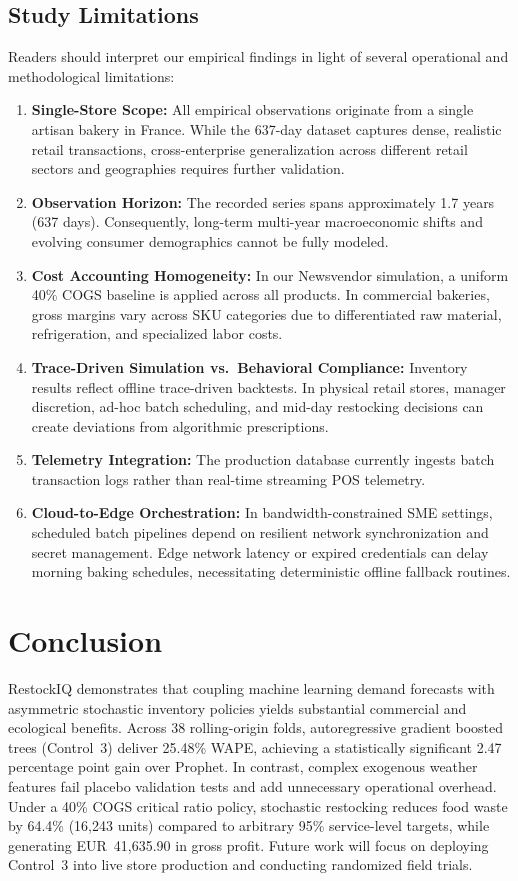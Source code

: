 \documentclass[conference]{IEEEtran}
\begin{document}
\subsection{Study Limitations}
Readers should interpret our empirical findings in light of several operational and methodological limitations:
\begin{enumerate}
    \item \textbf{Single-Store Scope:} All empirical observations originate from a single artisan bakery in France. While the 637-day dataset captures dense, realistic retail transactions, cross-enterprise generalization across different retail sectors and geographies requires further validation.
    \item \textbf{Observation Horizon:} The recorded series spans approximately 1.7 years (637 days). Consequently, long-term multi-year macroeconomic shifts and evolving consumer demographics cannot be fully modeled.
    \item \textbf{Cost Accounting Homogeneity:} In our Newsvendor simulation, a uniform 40\% COGS baseline is applied across all products. In commercial bakeries, gross margins vary across SKU categories due to differentiated raw material, refrigeration, and specialized labor costs.
    \item \textbf{Trace-Driven Simulation vs.\ Behavioral Compliance:} Inventory results reflect offline trace-driven backtests. In physical retail stores, manager discretion, ad-hoc batch scheduling, and mid-day restocking decisions can create deviations from algorithmic prescriptions.
    \item \textbf{Telemetry Integration:} The production database currently ingests batch transaction logs rather than real-time streaming POS telemetry.
    \item \textbf{Cloud-to-Edge Orchestration:} In bandwidth-constrained SME settings, scheduled batch pipelines depend on resilient network synchronization and secret management. Edge network latency or expired credentials can delay morning baking schedules, necessitating deterministic offline fallback routines.
\end{enumerate}

\section{Conclusion}
RestockIQ demonstrates that coupling machine learning demand forecasts with asymmetric stochastic inventory policies yields substantial commercial and ecological benefits. Across 38 rolling-origin folds, autoregressive gradient boosted trees (Control~3) deliver 25.48\% WAPE, achieving a statistically significant 2.47 percentage point gain over Prophet. In contrast, complex exogenous weather features fail placebo validation tests and add unnecessary operational overhead. Under a 40\% COGS critical ratio policy, stochastic restocking reduces food waste by 64.4\% (16,243 units) compared to arbitrary 95\% service-level targets, while generating EUR~41,635.90 in gross profit. Future work will focus on deploying Control~3 into live store production and conducting randomized field trials.
\end{document}
